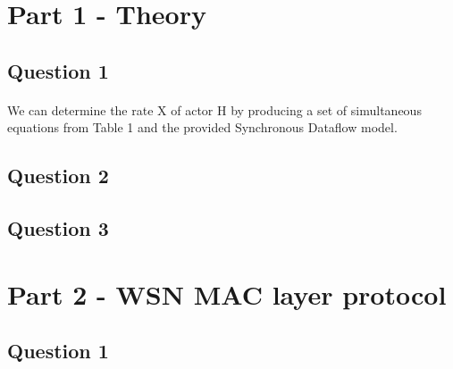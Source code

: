 \documentclass[12pt]{article} %
\begin{document}
\section{Part 1 - Theory} %


\subsection{Question 1} %

\paragraph{}
We can determine the rate X of actor H by producing a set of simultaneous equations from Table 1 and the provided Synchronous Dataflow model.


\subsection{Question 2} %



\subsection{Question 3} %




\section{Part 2 - WSN MAC layer protocol} %



\subsection{Question 1} %

\end{document}
